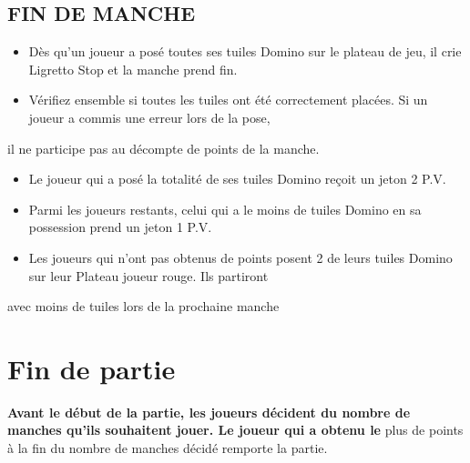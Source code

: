 \documentclass{article}%
\begin{document}
\subsection{ FIN DE MANCHE
}%
\label{subsec:FINDEMANCHE}%
\begin{itemize}%
\item%
%
 Dès qu’un joueur a posé toutes ses tuiles Domino sur le plateau de jeu, il crie Ligretto Stop et la manche prend fin.
%
\item%
%
 Vérifiez ensemble si toutes les tuiles ont été correctement placées. Si un joueur a commis une erreur lors de la pose,
%
\end{itemize}%
il ne participe pas au décompte de points de la manche.
%
\begin{itemize}%
\item%
%
 Le joueur qui a posé la totalité de ses tuiles Domino reçoit un jeton 2 P.V.
%
\item%
%
 Parmi les joueurs restants, celui qui a le moins de tuiles Domino en sa possession prend un jeton 1 P.V.
%
\item%
%
 Les joueurs qui n'ont pas obtenus de points posent 2 de leurs tuiles Domino sur leur Plateau joueur rouge. Ils partiront
%
\end{itemize}%
avec moins de tuiles lors de la prochaine manche


%
\section{ Fin de partie
}%
\label{sec:Findepartie}%
\textbf{Avant le début de la partie, les joueurs décident du nombre de manches qu’ils souhaitent jouer. Le joueur qui a obtenu le
}%
plus de points à la fin du nombre de manches décidé remporte la partie.%
\textbf{}

%
\end{document}
